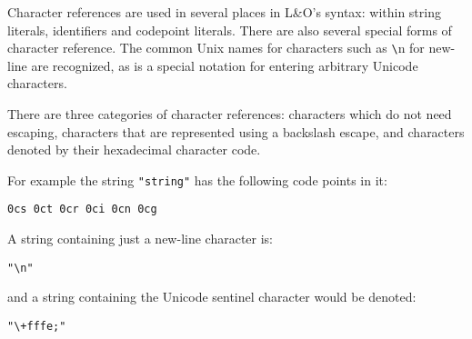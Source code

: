 Character references are used in several places in L&O's syntax: within string literals, identifiers and codepoint literals. There are also several special forms of character reference. The common Unix names for characters such as \verb+\+n for new-line are recognized, as is a special notation for entering arbitrary Unicode characters.

There are three categories of character references: characters which do not need escaping, characters that are represented using a backslash escape, and characters denoted by their hexadecimal character code.

For example the string \verb+"string"+ has the following code points in it:
\begin{verbatim}
0cs 0ct 0cr 0ci 0cn 0cg
\end{verbatim}
A string containing just a new-line character is:
\begin{verbatim}
"\n"
\end{verbatim}
and a string containing the Unicode sentinel character would be denoted:
\begin{verbatim}
"\+fffe;"
\end{verbatim}

